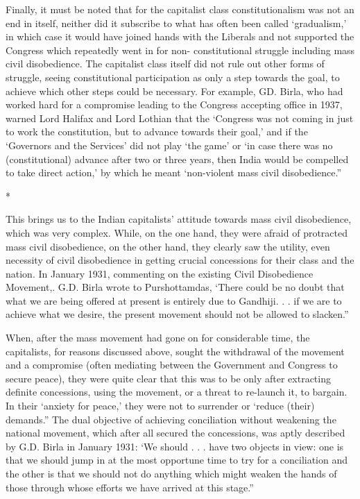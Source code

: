 Finally, it must be noted that for the capitalist class constitutionalism was not an end in itself, neither did it subscribe to what has often been called ‘gradualism,’ in which case it would have joined hands with the Liberals and not supported the Congress which repeatedly went in for non- constitutional struggle including mass civil disobedience. The capitalist class itself did not rule out other forms of struggle, seeing constitutional participation as only a step towards the goal, to achieve which other steps could be necessary. For example, GD. Birla, who had worked hard for a compromise leading to the Congress accepting office in 1937, warned Lord Halifax and Lord Lothian that the ‘Congress was not coming in just to work the constitution, but to advance towards their goal,’ and if the ‘Governors and the Services’ did not play ‘the game’ or ‘in case there was no (constitutional) advance after two or three years, then India would be compelled to take direct action,’ by which he meant ‘non-violent mass civil disobedience.”

\begin{center}*\end{center}



This brings us to the Indian capitalists’ attitude towards mass civil disobedience, which was very complex. While, on the one hand, they were afraid of protracted mass civil disobedience, on the other hand, they clearly saw the utility, even necessity of civil disobedience in getting crucial concessions for their class and the nation. In January 1931, commenting on the existing Civil Disobedience Movement,. G.D. Birla wrote to Purshottamdas, ‘There could be no doubt that what we are being offered at present is entirely due to Gandhiji. . . if we are to achieve what we desire, the present movement should not be allowed to slacken.” 

When, after the mass movement had gone on for considerable time, the capitalists, for reasons discussed above, sought the withdrawal of the movement and a compromise (often mediating between the Government and Congress to secure peace), they were quite clear that this was to be only after extracting definite concessions, using the movement, or a threat to re-launch it, to bargain. In their ‘anxiety for peace,’ they were not to surrender or ‘reduce (their) demands.” The dual objective of achieving conciliation without weakening the national movement, which after all secured the concessions, was aptly described by G.D. Birla in January 1931: ‘We should . . . have two objects in view: one is that we should jump in at the most opportune time to try for a conciliation and the other is that we should not do anything which might weaken the hands of those through whose efforts we have arrived at this stage.” 

